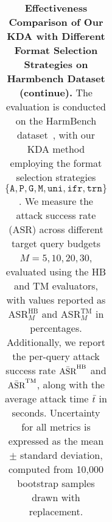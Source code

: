 \begin{table}[H]
{\begin{tabular}{c|c||c|c|c|c||c|c|c}
\hline
\end{tabular}
}
\caption{
\textbf{Effectiveness Comparison of Our KDA with Different Format Selection Strategies on Harmbench Dataset (continue).} The evaluation is conducted on the HarmBench dataset~\citep{chao_jailbreaking_2024}, with our KDA method employing the format selection strategies $\{\texttt{A},\texttt{P}, \texttt{G}, \texttt{M}, \texttt{uni}, \texttt{ifr}, \texttt{trn}\}$. We measure the attack success rate (ASR) across different target query budgets $M=5,10,20,30$, evaluated using the HB and TM evaluators, with values reported as $\text{ASR}^{\text{HB}}_{M}$ and $\text{ASR}^{\text{TM}}_{M}$ in percentages. Additionally, we report the per-query attack success rate $\Bar{\text{ASR}}^{\text{HB}}$ and $\Bar{\text{ASR}}^{\text{TM}}$, along with the average attack time $\Bar{t}$ in seconds. Uncertainty for all metrics is expressed as the mean $\pm$ standard deviation, computed from 10,000 bootstrap samples drawn with replacement.
}
\end{table}




